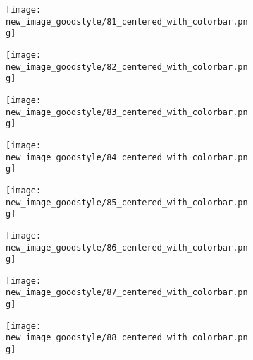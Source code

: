 \documentclass[a4paper,12pt]{article}
\begin{document}
\begin{figure}[H]
  \begin{subfigure}{0.11\textwidth}
    \texttt{[image: new\_image\_goodstyle/81\_centered\_with\_colorbar.png]}
  \end{subfigure}
  \hfill
  \begin{subfigure}{0.11\textwidth}
    \texttt{[image: new\_image\_goodstyle/82\_centered\_with\_colorbar.png]}
  \end{subfigure}
  \hfill
  \begin{subfigure}{0.11\textwidth}
    \texttt{[image: new\_image\_goodstyle/83\_centered\_with\_colorbar.png]}
  \end{subfigure}
  \hfill
  \begin{subfigure}{0.11\textwidth}
    \texttt{[image: new\_image\_goodstyle/84\_centered\_with\_colorbar.png]}
  \end{subfigure}
  \hfill
  \begin{subfigure}{0.11\textwidth}
    \texttt{[image: new\_image\_goodstyle/85\_centered\_with\_colorbar.png]}
  \end{subfigure}
  \hfill
  \begin{subfigure}{0.11\textwidth}
    \texttt{[image: new\_image\_goodstyle/86\_centered\_with\_colorbar.png]}
  \end{subfigure}
  \hfill
  \begin{subfigure}{0.11\textwidth}
    \texttt{[image: new\_image\_goodstyle/87\_centered\_with\_colorbar.png]}
  \end{subfigure}
  \hfill
  \begin{subfigure}{0.11\textwidth}
    \texttt{[image: new\_image\_goodstyle/88\_centered\_with\_colorbar.png]}
  \end{subfigure}
  \hfill
\end{figure}
\end{document}
